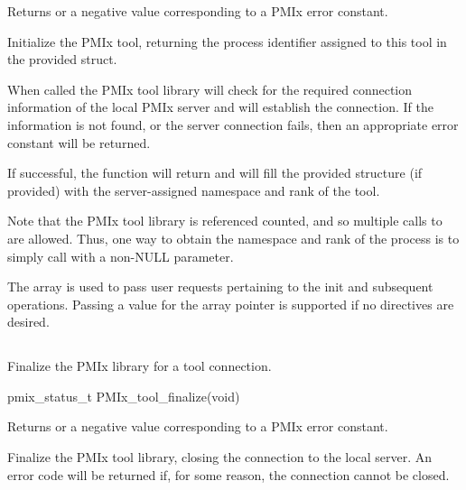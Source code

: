 Returns  or a negative value corresponding to a PMIx error constant.

\descr

Initialize the \ac{PMIx} tool, returning the process identifier assigned to this tool in the provided  struct.

When called the \ac{PMIx} tool library will check for the required connection information of the local \ac{PMIx} server and will establish the connection.
If the information is not found, or the server connection fails, then an appropriate error constant will be returned.

If successful, the function will return  and will fill the provided structure (if provided) with the server-assigned namespace and rank of the tool.

Note that the \ac{PMIx} tool library is referenced counted, and so multiple calls to  are allowed.
Thus, one way to obtain the namespace and rank of the process is to simply call  with a non-NULL parameter.

The  array is used to pass user requests pertaining to the init and subsequent operations.
Passing a  value for the array pointer is supported if no directives are desired.


\subsection{}

\summary

Finalize the \ac{PMIx} library for a tool connection.

\format

\cspecificstart
\begin{codepar}
pmix_status_t
PMIx_tool_finalize(void)
\end{codepar}
\cspecificend

Returns  or a negative value corresponding to a PMIx error constant.

\descr

Finalize the PMIx tool library, closing the connection to the local server.
An error code will be returned if, for some reason, the connection cannot be closed.


